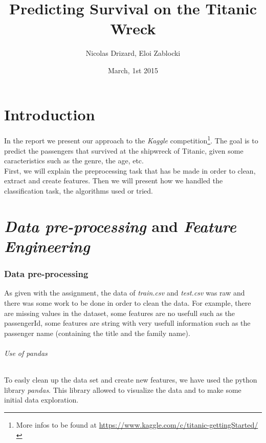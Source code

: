 \documentclass[11pt,a4paper,portrait]{article}
\author{Nicolas Drizard, Eloi Zablocki}
\date{March, 1st 2015}
\title{Predicting Survival on the Titanic Wreck}
\begin{document}
\maketitle


\newpage
\part*{Introduction}
In the report we present our approach to the \textit{Kaggle} competition\footnote{More infos to be found at \url{https://www.kaggle.com/c/titanic-gettingStarted/}}. The goal is to predict the passengers that survived at the shipwreck of Titanic, given some caracteristics such as the genre, the age, etc.\\
First, we will explain the preprocessing task that has be made in order to clean, extract and create features. Then we will present how we handled the classification task, the algorithms used or tried.

\part{\textit{Data pre-processing} and \textit{Feature Engineering}}
\setcounter{section}{0}


\section{Data pre-processing}
As given with the assignment, the data of \textit{train.csv} and \textit{test.csv} was raw and there was some work to be done in order to clean the data. For example, there are missing values in the dataset, some features are no usefull such as the passengerId, some features are string with very usefull information such as the passenger name (containing the title and the family name).

\paragraph{Use of pandas}
To easly clean up the data set and create new features, we have used the python library \textit{pandas}. This library allowed to visualize the data and to make some initial data exploration.
\end{document}
